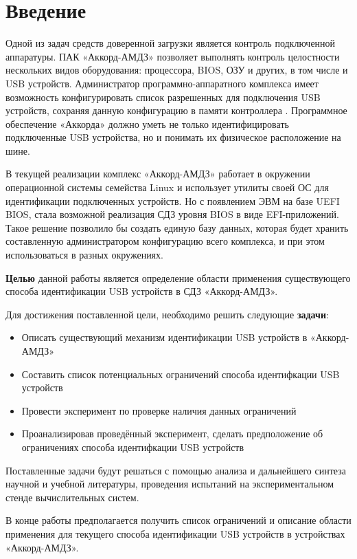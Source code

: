 \section{Введение}
Одной из задач средств доверенной загрузки является контроль подключенной аппаратуры. ПАК «Аккорд-АМДЗ» позволяет выполнять контроль
целостности нескольких видов оборудования: процессора, BIOS, ОЗУ и других, в том числе и USB устройств. Администратор программно-аппаратного
комплекса имеет возможность конфигурировать список разрешенных для подключения USB устройств, сохраняя данную конфигурацию в
памяти контроллера \cite{admin_amdz}. Программное обеспечение «Аккорда» должно уметь не только идентифицировать подключенные USB устройства, но и
понимать их физическое расположение на шине.
\par
В текущей реализации комплекс «Аккорд-АМДЗ» работает в окружении операционной системы семейства Linux и использует утилиты своей ОС для
идентификации подключенных устройств. Но с появлением ЭВМ на базе UEFI BIOS, стала возможной реализация СДЗ уровня BIOS в виде EFI-приложений.
Такое решение позволило бы создать единую базу данных, которая будет хранить составленную администратором конфигурацию всего комплекса, и при этом
использоваться в разных окружениях.
\par
\textbf{Целью} данной работы является определение области применения существующего способа идентификации USB устройств в СДЗ «Аккорд-АМДЗ».
\par
Для достижения поставленной цели, необходимо решить следующие \textbf{задачи}:
\begin{itemize}
  \item Описать существующий механизм идентификации USB устройств в «Аккорд-АМДЗ»
  \item Составить список потенциальных ограничений способа идентифкации USB устройств
  \item Провести эксперимент по проверке наличия данных ограничений
  \item Проанализировав проведённый эксперимент, сделать предположение об ограничениях способа идентифкации USB устройств
\end{itemize}
Поставленные задачи будут решаться с помощью анализа и дальнейшего синтеза научной и учебной литературы, проведения испытаний на
экспериментальном стенде вычислительных систем.
\par
В конце работы предполагается получить список ограничений и описание области применения для текущего способа идентификации USB устройств в
устройствах «Аккорд-АМДЗ».
\clearpage